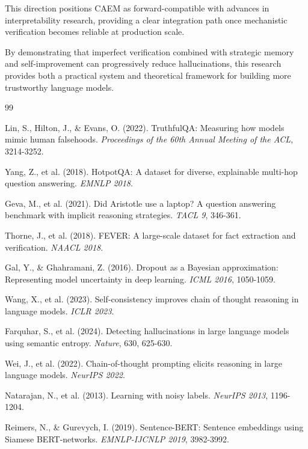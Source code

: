 \documentclass[12pt,a4paper]{article}
\theoremstyle{definition}
\newcommand{\caem}{\textsc{CAEM}}
\begin{document}
This direction positions \caem{} as forward-compatible with advances in interpretability research, providing a clear integration path once mechanistic verification becomes reliable at production scale.

By demonstrating that imperfect verification combined with strategic memory and self-improvement can progressively reduce hallucinations, this research provides both a practical system and theoretical framework for building more trustworthy language models.


\begin{thebibliography}{99}

Lin, S., Hilton, J., \& Evans, O. (2022).
TruthfulQA: Measuring how models mimic human falsehoods.
\textit{Proceedings of the 60th Annual Meeting of the ACL}, 3214-3252.

Yang, Z., et al. (2018).
HotpotQA: A dataset for diverse, explainable multi-hop question answering.
\textit{EMNLP 2018}.

Geva, M., et al. (2021).
Did Aristotle use a laptop? A question answering benchmark with implicit reasoning strategies.
\textit{TACL 9}, 346-361.

Thorne, J., et al. (2018).
FEVER: A large-scale dataset for fact extraction and verification.
\textit{NAACL 2018}.

Gal, Y., \& Ghahramani, Z. (2016).
Dropout as a Bayesian approximation: Representing model uncertainty in deep learning.
\textit{ICML 2016}, 1050-1059.

Wang, X., et al. (2023).
Self-consistency improves chain of thought reasoning in language models.
\textit{ICLR 2023}.

Farquhar, S., et al. (2024).
Detecting hallucinations in large language models using semantic entropy.
\textit{Nature}, 630, 625-630.

Wei, J., et al. (2022).
Chain-of-thought prompting elicits reasoning in large language models.
\textit{NeurIPS 2022}.

Natarajan, N., et al. (2013).
Learning with noisy labels.
\textit{NeurIPS 2013}, 1196-1204.

Reimers, N., \& Gurevych, I. (2019).
Sentence-BERT: Sentence embeddings using Siamese BERT-networks.
\textit{EMNLP-IJCNLP 2019}, 3982-3992.


\end{thebibliography}
\end{document}
